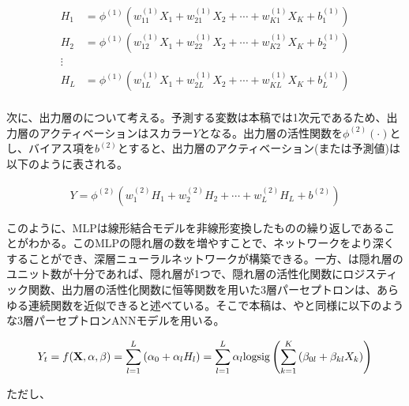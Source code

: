 \documentclass[a4paper, 12pt]{jsreport}
\begin{document}
\begin{equation}
  \begin{split}
    H_1 &= \phi^{(1)}(w^{(1)}_{11} X_1 + w^{(1)}_{21} X_2 + \cdots + w^{(1)}_{K1} X_K + b^{(1)}_1) \\
    H_2 &= \phi^{(1)}(w^{(1)}_{12} X_1 + w^{(1)}_{22} X_2 + \cdots + w^{(1)}_{K2} X_K + b^{(1)}_2) \\
    \vdots \\
    H_L &= \phi^{(1)}(w^{(1)}_{1L} X_1 + w^{(1)}_{2L} X_2 + \cdots + w^{(1)}_{KL} X_K + b^{(1)}_L) \\
  \end{split}
\end{equation}

 次に、出力層のについて考える。予測する変数は本稿では1次元であるため、出力層のアクティベーションはスカラー$Y$となる。出力層の活性関数を$\phi^{(2)}(\cdot)$とし、バイアス項を$b^{(2)}$とすると、出力層のアクティベーション(または予測値)は以下のように表される。

\begin{equation}
  \begin{split}
    Y = \phi^{(2)}(w^{(2)}_{1} H_1 + w^{(2)}_{2} H_2 + \cdots + w^{(2)}_{L} H_L + b^{(2)})
  \end{split}
\end{equation}

このように、MLPは線形結合モデルを非線形変換したものの繰り返しであることがわかる。このMLPの隠れ層の数を増やすことで、ネットワークをより深くすることができ、深層ニューラルネットワークが構築できる。一方、\cite{qi1999nonlinear}は隠れ層のユニット数が十分であれば、隠れ層が1つで、隠れ層の活性化関数にロジスティック関数、出力層の活性化関数に恒等関数を用いた3層パーセプトロンは、あらゆる連続関数を近似できると述べている。そこで本稿は、\cite{callen1996neural}や\cite{zhang2004neural}と同様に以下のような3層パーセプトロンANNモデルを用いる。

\begin{equation}
  \begin{split}
    Y_t &= f({\bf X, \alpha, \beta}) =\sum^{L}_{l=1} \left(\alpha_0 + \alpha_l H_l \right)= \sum^{L}_{l=1} \alpha_l \text{logsig} \left(\sum^{K}_{k=1} \left(\beta_{0l} + \beta_{kl} X_k \right) \right) \\
  \end{split}
\end{equation}

ただし、
\end{document}
